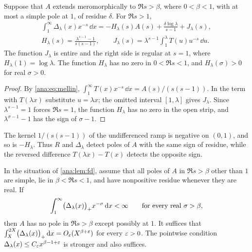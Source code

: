 \begin{lemma}\label{ana:lem:fd}
Suppose that $A$ extends meromorphically to $\Re s>\beta$, where $0<\beta<1$, with at most a
simple pole at $1$, of residue $\delta$. For $\Re s>1$,
\begin{gather*}
 \int_1^\infty\Delta_\lambda(x)x^{-s}\,\dd x
 =-H_\lambda(s)A(s)+\frac{\delta\log\lambda}{s-1}+J_\lambda(s),\\
 H_\lambda(s)=\frac{\lambda^{s-1}-1}{s(s-1)},\qquad
 J_\lambda(s)=\lambda^{s-1}\int_1^\lambda T(u)u^{-s}\,\dd u .
\end{gather*}
The function $J_\lambda$ is entire and the right side is regular at $s=1$, where
$H_\lambda(1)=\log\lambda$. The function $H_\lambda$ has no zero in $0<\Re s<1$, and
$H_\lambda(\sigma)>0$ for real $\sigma>0$.
\end{lemma}

\begin{proof}
By \eqref{ana:eq:mellin}, $\int_1^\infty T(x)x^{-s}\,\dd x=A(s)/(s(s-1))$. In the term with
$T(\lambda x)$ substitute $u=\lambda x$; the omitted interval $[1,\lambda]$ gives $J_\lambda$.
Since $\lambda^{s-1}=1$ forces $\Re s=1$, the function $H_\lambda$ has no zero in the open
strip, and $\lambda^{\sigma-1}-1$ has the sign of $\sigma-1$.
\end{proof}

The kernel $1/(s(s-1))$ of the undifferenced ramp is negative on $(0,1)$, and so is
$-H_\lambda$. Thus $R$ and $\Delta_\lambda$ detect poles of $A$ with the same sign of residue,
while the reversed difference $T(\lambda x)-T(x)$ detects the opposite sign.

\begin{theorem}\label{ana:thm:fd}
In the situation of \cref{ana:lem:fd}, assume that all poles of $A$ in $\Re s>\beta$ other than
$1$ are simple, lie in $\beta<\Re s<1$, and have nonpositive residue whenever they are real. If
\begin{equation}\label{ana:eq:fdint}
 \int_1^\infty\bigl(\Delta_\lambda(x)\bigr)_{+}x^{-\sigma}\,\mathrm{d} x<\infty
 \qquad\text{for every real }\sigma>\beta,
\end{equation}
then $A$ has no pole in $\Re s>\beta$ except possibly at $1$. It suffices that
$\int_X^{2X}\bigl(\Delta_\lambda(x)\bigr)_{+}\,\mathrm{d} x=O_\varepsilon(X^{\beta+\varepsilon})$ for every $\varepsilon>0$. The
pointwise condition $\Delta_\lambda(x)\le C_\varepsilon x^{\beta-1+\varepsilon}$ is stronger and also suffices.
\end{theorem}

